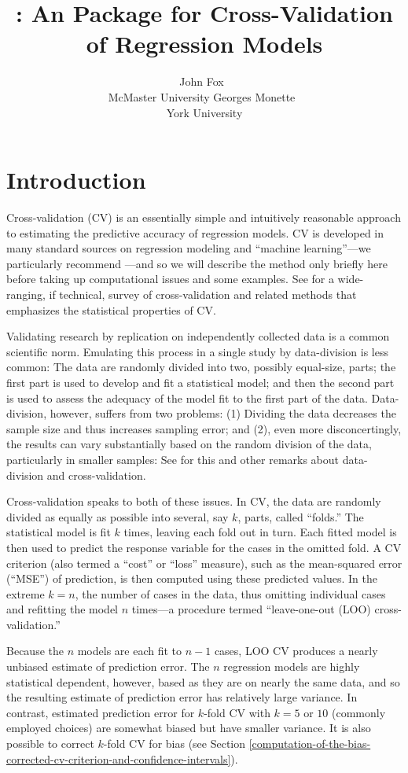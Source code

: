 \documentclass[
]{jss}
\author{
John Fox~\orcidlink{0000-0002-1196-8012}\\McMaster
University \And Georges Monette~\orcidlink{0000-0000-0000-0000}\\York
University
}
\title{\pkg{cv}: An \proglang{R} Package for Cross-Validation of
Regression Models}
\begin{document}
\hypertarget{introduction}{%
\section{Introduction}\label{introduction}}

Cross-validation (CV) is an essentially simple and intuitively
reasonable approach to estimating the predictive accuracy of regression
models. CV is developed in many standard sources on regression modeling
and ``machine learning''---we particularly recommend \citet[Secs. 5.1,
5.3]{JamesEtAl:2021}---and so we will describe the method only briefly
here before taking up computational issues and some examples. See
\citet{ArlotCelisse:2010} for a wide-ranging, if technical, survey of
cross-validation and related methods that emphasizes the statistical
properties of CV.

Validating research by replication on independently collected data is a
common scientific norm. Emulating this process in a single study by
data-division is less common: The data are randomly divided into two,
possibly equal-size, parts; the first part is used to develop and fit a
statistical model; and then the second part is used to assess the
adequacy of the model fit to the first part of the data. Data-division,
however, suffers from two problems: (1) Dividing the data decreases the
sample size and thus increases sampling error; and (2), even more
disconcertingly, the results can vary substantially based on the random
division of the data, particularly in smaller samples: See \citet[Sec.
5.3]{Harrell:2015} for this and other remarks about data-division and
cross-validation.

Cross-validation speaks to both of these issues. In CV, the data are
randomly divided as equally as possible into several, say \(k\), parts,
called ``folds.'' The statistical model is fit \(k\) times, leaving each
fold out in turn. Each fitted model is then used to predict the response
variable for the cases in the omitted fold. A CV criterion (also termed
a ``cost'' or ``loss'' measure), such as the mean-squared error
(``MSE'') of prediction, is then computed using these predicted values.
In the extreme \(k = n\), the number of cases in the data, thus omitting
individual cases and refitting the model \(n\) times---a procedure
termed ``leave-one-out (LOO) cross-validation.''

Because the \(n\) models are each fit to \(n - 1\) cases, LOO CV
produces a nearly unbiased estimate of prediction error. The \(n\)
regression models are highly statistical dependent, however, based as
they are on nearly the same data, and so the resulting estimate of
prediction error has relatively large variance. In contrast, estimated
prediction error for \(k\)-fold CV with \(k = 5\) or \(10\) (commonly
employed choices) are somewhat biased but have smaller variance. It is
also possible to correct \(k\)-fold CV for bias (see Section
\ref{computation-of-the-bias-corrected-cv-criterion-and-confidence-intervals}).
\end{document}
